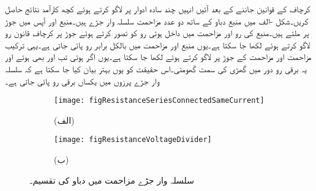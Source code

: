 کرچاف کے قوانین جاننے کے بعد آئیں انہیں چند سادہ ادوار پر لاگو کرتے ہوئے کچھ کارآمد نتائج حاصل کریں۔شکل -الف میں منبع دباو  کے ساتھ دو عدد مزاحمت سلسلہ وار جڑے ہیں۔منبع اور  آپس میں جوڑ  پر ملتے ہیں۔منبع کی رو  اور مزاحمت میں داخل ہوتی رو کو  تصور کرتے ہوئے جوڑ  پر کرچاف قانون رو لاگو کرتے   ہوئے  لکھا جا سکتا ہے۔یوں منبع اور مزاحمت  میں بالکل برابر رو پائی جاتی ہے۔یہی ترکیب مزاحمت  اور مزاحمت  کے جوڑ  پر لاگو کرتے ہوئے  لکھا جا سکتا ہے۔یوں اگر  ہوتی تب  اور  بھی  ہوتے اور یہ برقی رو دور میں گھڑی کی سمت گھومتی۔اس حقیقت کو یوں بہتر بیان کیا جا سکتا ہے کہ سلسلہ وار جڑے پرزوں میں یکساں برقی رو پائی جاتی ہے۔
\begin{figure}
\centering
\begin{subfigure}{0.5\textwidth}
\centering
\texttt{[image: figResistanceSeriesConnectedSameCurrent]}
\caption*{(الف)}
\end{subfigure}%
%
\begin{subfigure}{0.5\textwidth}
\centering
\texttt{[image: figResistanceVoltageDivider]}
\caption*{(ب)}
\end{subfigure}%
\caption{سلسلہ وار جڑے مزاحمت میں دباو کی تقسیم۔}
\label{شکل_مزاحمتی_دباو_تقسیم}
\end{figure}

